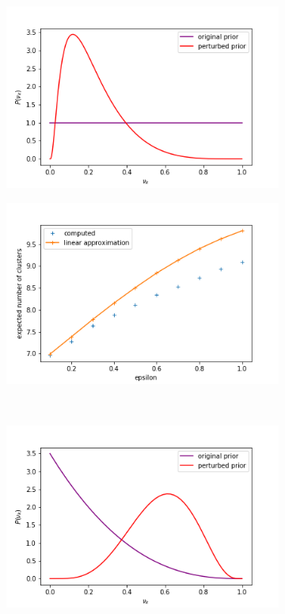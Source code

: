 \documentclass{article}
\begin{document}
\begin{figure}[h!]
	\centering
	\begin{subfigure}[t]{0.32\textwidth}
		\includegraphics[width = \textwidth]{./functional_sens_results/perturbed_prior1_init3_5.png}
		\subcaption{}
	\end{subfigure}
  \begin{subfigure}[t]{0.32\textwidth}
    \includegraphics[width = \textwidth]{./functional_sens_results/pred_num_clusters1_init3_5.png}
    \subcaption{}
  \end{subfigure}\\
  \centering
  \begin{subfigure}[t]{0.32\textwidth}
    \includegraphics[width = \textwidth]{./functional_sens_results/perturbed_prior2_init3_5.png}

\end{subfigure}
\end{figure}
\end{document}
